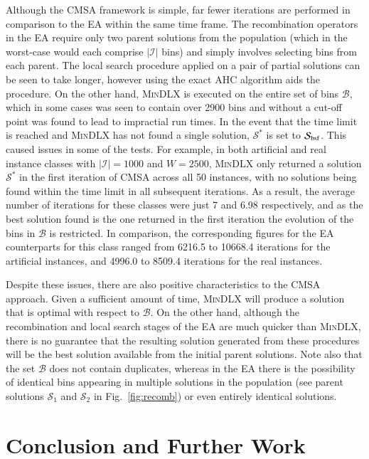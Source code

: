 \documentclass[a4paper,11pt,authoryear]{elsarticle}
\begin{document}
Although the CMSA framework is simple, far fewer iterations are performed in comparison to the EA within the same time frame. The recombination operators in the EA require only two parent solutions from the population (which in the worst-case would each comprise $|\mathcal{I}|$ bins) and simply involves selecting bins from each parent. The local search procedure applied on a pair of partial solutions can be seen to take longer, however using the exact AHC algorithm aids the procedure. On the other hand, \textsc{MinDLX} is executed on the entire set of bins $\mathcal{B}$, which in some cases was seen to contain over 2900 bins and without a cut-off point was found to lead to impractial run times. In the event that the time limit is reached and \textsc{MinDLX} has not found a single solution, $\mathcal{S}^*$ is set to $\mathcal{S}_{\textup{bsf}}$. This caused issues in some of the tests. For example, in both artificial and real instance classes with $|\mathcal{I}| = 1000$ and $W =2500$, \textsc{MinDLX} only returned a solution $\mathcal{S}^*$ in the first iteration of CMSA across all 50 instances, with no solutions being found within the time limit in all subsequent iterations. As a result, the average number of iterations for these classes were just 7 and 6.98 respectively, and as the best solution found is the one returned in the first iteration the evolution of the bins in $\mathcal{B}$ is restricted. In comparison, the corresponding figures for the EA counterparts for this class ranged from 6216.5 to 10668.4 iterations for the artificial instances, and 4996.0 to 8509.4 iterations for the real instances.

Despite these issues, there are also positive characteristics to the CMSA approach. Given a sufficient amount of time, \textsc{MinDLX} will produce a solution that is optimal with respect to $\mathcal{B}$. On the other hand, although the recombination and local search stages of the EA are much quicker than \textsc{MinDLX}, there is no guarantee that the resulting solution generated from these procedures will be the best solution available from the initial parent solutions. Note also that the set $\mathcal{B}$ does not contain duplicates, whereas in the EA there is the possibility of identical bins appearing in multiple solutions in the population (see parent solutions $\mathcal{S}_1$ and $\mathcal{S}_2$ in Fig.~\ref{fig:recomb}) or even entirely identical solutions.

\section{Conclusion and Further Work}
\label{sec:conclusion}
\end{document}
